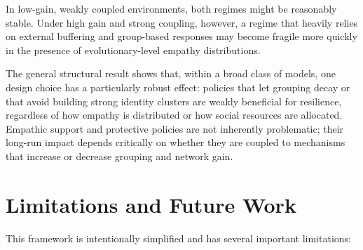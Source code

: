 \documentclass[11pt]{article}
\theoremstyle{plain}
\begin{document}
In low-gain, weakly coupled environments, both regimes might be reasonably stable.
Under high gain and strong coupling, however, a regime that heavily relies on external buffering and group-based responses may become fragile more quickly in the presence of evolutionary-level empathy distributions.

The general structural result shows that, within a broad class of models, one design choice has a particularly robust effect:
policies that let grouping decay or that avoid building strong identity clusters are weakly beneficial for resilience, regardless of how empathy is distributed or how social resources are allocated.
Empathic support and protective policies are not inherently problematic; their long-run impact depends critically on whether they are coupled to mechanisms that increase or decrease grouping and network gain.

\section{Limitations and Future Work}

This framework is intentionally simplified and has several important limitations:
\end{document}
